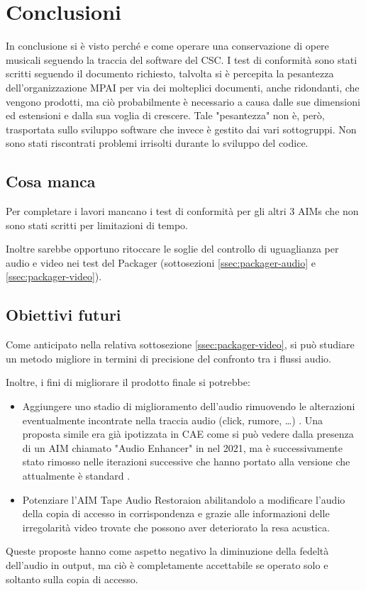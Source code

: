 
\chapter{Conclusioni} \label{chp:conclusioni}
In conclusione si è visto perché e come operare una conservazione di opere musicali seguendo la traccia del software del \ac{CSC}.
I test di conformità sono stati scritti seguendo il documento richiesto, talvolta si è percepita la pesantezza dell'organizzazione \ac{MPAI} per via dei molteplici documenti, anche ridondanti, che vengono prodotti, ma ciò probabilmente è necessario a causa dalle sue dimensioni ed estensioni e dalla sua voglia di crescere. Tale "pesantezza" non è, però, trasportata sullo sviluppo software che invece è gestito dai vari sottogruppi.   %
Non sono stati riscontrati problemi irrisolti durante lo sviluppo del codice.


\section{Cosa manca}  %
Per completare i lavori mancano i test di conformità per gli altri 3 \acp{AIM} che non sono stati scritti per limitazioni di tempo.

Inoltre sarebbe opportuno ritoccare le soglie del controllo di uguaglianza per audio e video nei test del Packager (sottosezioni \ref{ssec:packager-audio} e \ref{ssec:packager-video}).


\section{Obiettivi futuri}  %
Come anticipato nella relativa sottosezione \ref{ssec:packager-video}, si può studiare un metodo migliore in termini di precisione del confronto tra i flussi audio.

Inoltre, i fini di migliorare il prodotto finale si potrebbe:
\begin{itemize}
    \item Aggiungere uno stadio di miglioramento dell'audio rimuovendo le alterazioni eventualmente incontrate nella traccia audio (click, rumore, \dots) \cite{godsillDigitalAudioRestoration1998}.
    Una proposta simile era già ipotizzata in \ac{CAE} come si può vedere dalla presenza di un \ac{AIM} chiamato "Audio Enhancer" in \cite{mpaiMPAICAEUseCases2021} nel 2021, ma è successivamente stato rimosso nelle iterazioni successive che hanno portato alla versione che attualmente è standard .
    \item Potenziare l'\ac{AIM} Tape Audio Restoraion abilitandolo a modificare l'audio della copia di accesso in corrispondenza e grazie alle informazioni delle irregolarità video trovate che possono aver deteriorato la resa acustica.
\end{itemize}

Queste proposte hanno come aspetto negativo la diminuzione della fedeltà dell'audio in output, ma ciò è completamente accettabile se operato solo e soltanto sulla copia di accesso.
